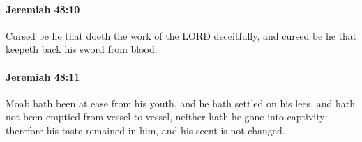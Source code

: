		\paragraph{Jeremiah 48:10} %
			\label{JEREMIAH-48-10}

			Cursed be he that doeth the work of the LORD deceitfully, and cursed be he that keepeth back his sword from blood.


		\paragraph{Jeremiah 48:11} %
			\label{JEREMIAH-48-11}

			Moab hath been at ease from his youth, and he hath settled on his lees, and hath not been emptied from vessel to vessel, neither hath he gone into captivity: therefore his taste remained in him, and his scent is not changed.


